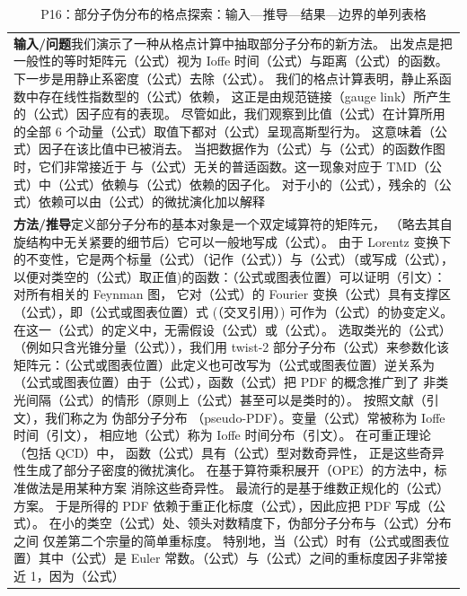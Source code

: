 \documentclass[UTF8,11pt,oneside]{ctexbook}
\begin{document}
\begin{table}[htbp]
  \centering
  \caption*{P16：部分子伪分布的格点探索：输入—推导—结果—边界的单列表格}
  \small
  \begin{tabular}{@{}p{}@{}}
    \toprule
    \textbf{输入/问题}\quad 我们演示了一种从格点计算中抽取部分子分布的新方法。 出发点是把一般性的等时矩阵元（公式）视为 Ioffe 时间（公式）与距离（公式）的函数。 下一步是用静止系密度（公式）去除（公式）。 我们的格点计算表明，静止系函数中存在线性指数型的（公式）依赖， 这正是由规范链接（gauge link）所产生的（公式）因子应有的表现。 尽管如此，我们观察到比值（公式）在计算所用的全部 6 个动量（公式）取值下都对（公式）呈现高斯型行为。 这意味着（公式）因子在该比值中已被消去。 当把数据作为（公式）与（公式）的函数作图时，它们非常接近于 与（公式）无关的普适函数。这一现象对应于 TMD（公式）中（公式）依赖与（公式）依赖的因子化。 对于小的（公式），残余的（公式）依赖可以由（公式）的微扰演化加以解释 \\
    \textbf{方法/推导}\quad 定义部分子分布的基本对象是一个双定域算符的矩阵元， （略去其自旋结构中无关紧要的细节后）它可以一般地写成（公式）。 由于 Lorentz 变换下的不变性，它是两个标量（公式）（记作（公式））与（公式）（或写成（公式），以便对类空的（公式）取正值)的函数：（公式或图表位置）可以证明（引文）：对所有相关的 Feynman 图， 它对（公式）的 Fourier 变换（公式）具有支撑区（公式），即（公式或图表位置）式 (（交叉引用）) 可作为（公式）的协变定义。 在这一（公式）的定义中，无需假设（公式）或（公式）。 选取类光的（公式）（例如只含光锥分量（公式）），我们用 twist-2 部分子分布（公式）来参数化该矩阵元：（公式或图表位置）此定义也可改写为（公式或图表位置）逆关系为（公式或图表位置）由于（公式），函数（公式）把 PDF 的概念推广到了 非类光间隔（公式）的情形（原则上（公式）甚至可以是类时的）。 按照文献（引文），我们称之为 伪部分子分布 （pseudo-PDF）。变量（公式）常被称为 Ioffe 时间（引文）， 相应地（公式）称为 Ioffe 时间分布（引文）。 在可重正理论（包括 QCD）中， 函数（公式）具有（公式）型对数奇异性， 正是这些奇异性生成了部分子密度的微扰演化。 在基于算符乘积展开（OPE）的方法中，标准做法是用某种方案 消除这些奇异性。 最流行的是基于维数正规化的（公式）方案。 于是所得的 PDF 依赖于重正化标度（公式），因此应把 PDF 写成（公式）。 在小的类空（公式）处、领头对数精度下，伪部分子分布与（公式）分布之间 仅差第二个宗量的简单重标度。 特别地，当（公式）时有（公式或图表位置）其中（公式）是 Euler 常数。（公式）与（公式）之间的重标度因子非常接近 1，因为（公式） \\

\end{tabular}
\end{table}
\end{document}
